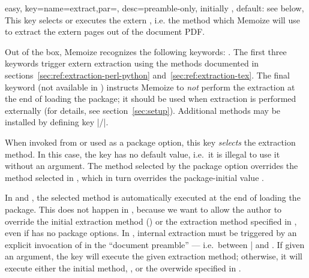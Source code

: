 \documentclass[a4paper,11pt]{article}
\begin{document}
\begin{doc}{easy,
    key={name=extract,par=,
      desc={preamble-only, initially , default: see below}},
  }
  This key selects or executes the extern , i.e. the
  method which Memoize will use to extract the extern pages out of the document
  PDF.

  Out of the box, Memoize recognizes the following 
  keywords: .  The first three keywords trigger extern extraction using
  the methods documented in sections~\ref{sec:ref:extraction-perl-python}
  and~\ref{sec:ref:extraction-tex}.  The final keyword (not available in
  ) instructs Memoize to \emph{not} perform the extraction at
  the end of loading the package; it should be used when extraction is
  performed externally (for details, see section~\ref{sec:setup}).  Additional
  methods may be installed by defining key |/|.
  
  When invoked from  or used as a package option, this key
  \emph{selects} the extraction method.  In this case, the key has no default
  value, i.e.\ it is illegal to use it without an argument.  The method
  selected by the package option overrides the method selected in
  , which in turn overrides the package-initial value
  .

  In  and , the selected method is automatically
  executed at the end of loading the package.  This does not happen in
  , because we want to allow the author to override the
  initial extraction method () or the extraction method
  specified in , even if  has no package
  options.  In , internal extraction must be triggered by an
  explicit invocation of  in the ``document preamble'' ---
  i.e.\ between | and .  If given an  argument, the key will
  execute the given extraction method; otherwise, it will execute either the
  initial method, , or the overwide specified in
  .


\end{doc}
\end{document}

